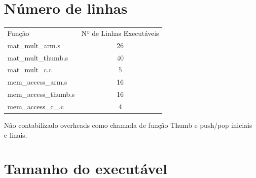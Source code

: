 \documentclass[a4paper,10pt]{article}
\begin{document}
\section*{Número de linhas}

\begin{table}[!h]
\begin{tabular}{lc}
\rowcolor[HTML]{CBCEFB} 
Função & \multicolumn{1}{l}{\cellcolor[HTML]{CBCEFB}Nº de Linhas Executáveis} \\
mat\_mult\_arm.s & 26 \\
\rowcolor[HTML]{C0C0C0} 
mat\_mult\_thumb.s & 40 \\
mat\_mult\_c.c & 5 \\
\rowcolor[HTML]{C0C0C0} 
mem\_access\_arm.s & 16 \\
mem\_access\_thumb.s & 16 \\
\rowcolor[HTML]{C0C0C0} 
mem\_access\_c\_.c & 4
\end{tabular}
\end{table}

Não contabilizado overheads como chamada de função Thumb e push/pop iniciais e finais.

\section*{Tamanho do executável}
\end{document}

